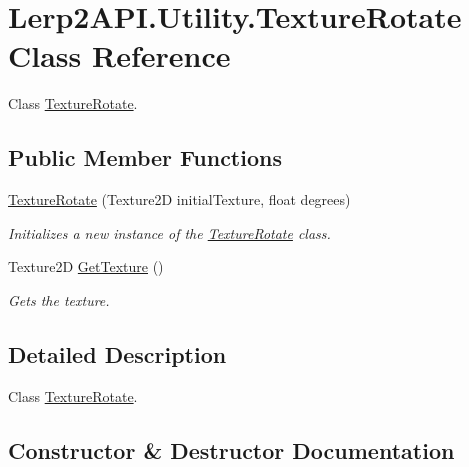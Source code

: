\hypertarget{class_lerp2_a_p_i_1_1_utility_1_1_texture_rotate}{}\section{Lerp2\+A\+P\+I.\+Utility.\+Texture\+Rotate Class Reference}
\label{class_lerp2_a_p_i_1_1_utility_1_1_texture_rotate}


Class \hyperlink{class_lerp2_a_p_i_1_1_utility_1_1_texture_rotate}{Texture\+Rotate}.  


\subsection*{Public Member Functions}
\begin{DoxyCompactItemize}
\item 
\hyperlink{class_lerp2_a_p_i_1_1_utility_1_1_texture_rotate_ab9bbcd9d2d0dfb84f4ab7b170027358e}{Texture\+Rotate} (Texture2D initial\+Texture, float degrees)
\begin{DoxyCompactList}\small\item\em Initializes a new instance of the \hyperlink{class_lerp2_a_p_i_1_1_utility_1_1_texture_rotate}{Texture\+Rotate} class. \end{DoxyCompactList}\item 
Texture2D \hyperlink{class_lerp2_a_p_i_1_1_utility_1_1_texture_rotate_af11a3d9639834022dd3fdaadc1bc583e}{Get\+Texture} ()
\begin{DoxyCompactList}\small\item\em Gets the texture. \end{DoxyCompactList}\end{DoxyCompactItemize}


\subsection{Detailed Description}
Class \hyperlink{class_lerp2_a_p_i_1_1_utility_1_1_texture_rotate}{Texture\+Rotate}. 



\subsection{Constructor \& Destructor Documentation}
\mbox{\label{class_lerp2_a_p_i_1_1_utility_1_1_texture_rotate_ab9bbcd9d2d0dfb84f4ab7b170027358e}} 
